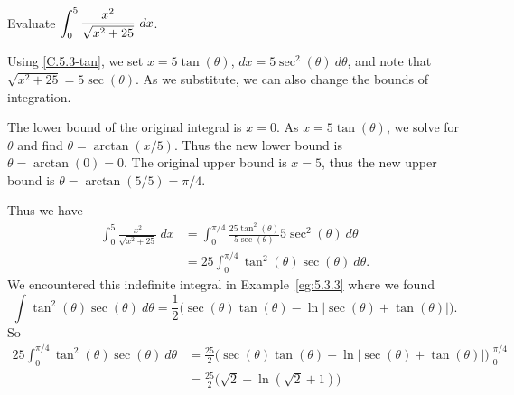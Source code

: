 \begin{example} \label{eg:5.3.5} %

Evaluate $\ds\int_0^5\frac{x^2}{\sqrt{x^2+25}}\ dx$.

\solution
Using \ref{C.5.3-tan}, we set $x=5\tan(\theta)$, $dx = 5\sec^2(\theta)\ d\theta$, and note that $\sqrt{x^2+25} = 5\sec(\theta)$. As we substitute, we can also change the bounds of integration.

The lower bound of the original integral is $x=0$. As $x=5\tan(\theta)$, we solve for $\theta$ and find $\theta = \arctan(x/5)$. Thus the new lower bound is $\theta = \arctan(0) = 0$. The original upper bound is $x=5$, thus the new upper bound is $\theta = \arctan(5/5) = \pi/4$. 

Thus we have 
\begin{align*}
\int_0^5\frac{x^2}{\sqrt{x^2+25}}\ dx &= \int_0^{\pi/4} \frac{25\tan^2(\theta)}{5\sec(\theta)}5\sec^2(\theta)\ d\theta\\
		&= 25\int_0^{\pi/4} \tan^2(\theta)\sec(\theta)\ d\theta.
\end{align*}
We encountered this indefinite integral in Example~\ref{eg:5.3.3} where we found 
$$\int \tan^2(\theta)\sec(\theta) \ d\theta = \frac12\big(\sec(\theta)\tan(\theta)-\ln|\sec(\theta)+\tan(\theta)|\big).$$
So
\begin{align*}
25\int_0^{\pi/4} \tan^2(\theta)\sec(\theta)\ d\theta &= \frac{25}2\big(\sec(\theta)\tan(\theta)-\ln|\sec(\theta)+\tan(\theta)|\big)\Bigg|_0^{\pi/4}\\
&= \frac{25}2\big(\sqrt2-\ln(\sqrt2+1)\big)
\end{align*}

\end{example}